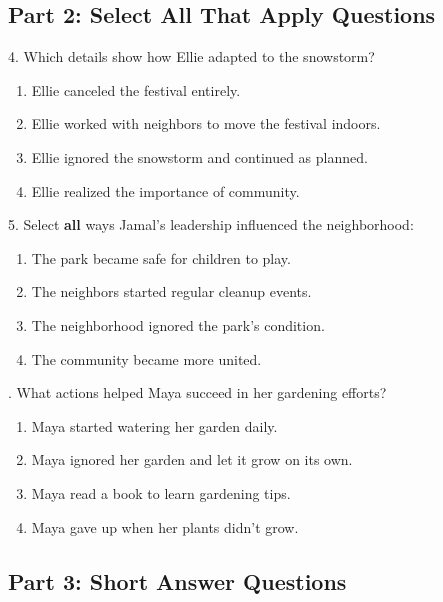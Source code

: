 \documentclass[12pt]{article}
\begin{document}
\vspace{1cm}

\subsection*{Part 2: Select All That Apply Questions}

4. Which details show how Ellie adapted to the snowstorm?\\
\begin{enumerate}[label=\Alph*.]
    \item Ellie canceled the festival entirely.  
    \item Ellie worked with neighbors to move the festival indoors.  
    \item Ellie ignored the snowstorm and continued as planned.  
    \item Ellie realized the importance of community.  
\end{enumerate}

\vspace{1cm}

5. Select \textbf{all} ways Jamal’s leadership influenced the neighborhood:\\
\begin{enumerate}[label=\Alph*.]
    \item The park became safe for children to play.  
    \item The neighbors started regular cleanup events.  
    \item The neighborhood ignored the park’s condition.  
    \item The community became more united.  
\end{enumerate}

\vspace{1cm}
. What actions helped Maya succeed in her gardening efforts?\\
\begin{enumerate}[label=\Alph*.]
    \item Maya started watering her garden daily.  
    \item Maya ignored her garden and let it grow on its own.  
    \item Maya read a book to learn gardening tips.  
    \item Maya gave up when her plants didn’t grow.  
\end{enumerate}



\subsection*{Part 3: Short Answer Questions}
\end{document}
